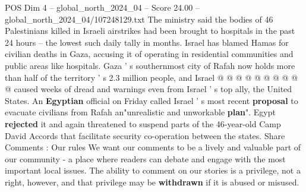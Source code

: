 \begin{textsample}{POS Dim 4 – global\_north\_2024\_04 – Score 24.00 – global\_north\_2024\_04/107248129.txt}
The ministry said the bodies of 46 Palestinians killed in Israeli airstrikes had been brought to hospitals in the past 24 hours -- the lowest such daily tally in months.
Israel has blamed Hamas for civilian deaths in Gaza, accusing it of operating in residential communities and public areas like hospitals.
Gaza ' s southernmost city of Rafah now holds more than half of the territory ' s 2.3 million people, and Israel @ @ @ @ @ @ @ @ @ @ caused weeks of dread and warnings even from Israel ' s top ally, the United States.
An \textbf{Egyptian} official on Friday called Israel ' s most recent \textbf{proposal} to evacuate civilians from Rafah an"unrealistic and unworkable \textbf{plan}".
Egypt \textbf{rejected} it and again threatened to suspend parts of the 46-year-old Camp David Accords that facilitate security co-operation between the states.
Share Comments : Our rules We want our comments to be a lively and valuable part of our community - a place where readers can debate and engage with the most important local issues.
The ability to comment on our stories is a privilege, not a right, however, and that privilege may be \textbf{withdrawn} if it is abused or misused.

\end{textsample}
